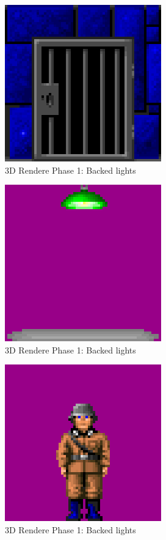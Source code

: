 \documentclass[book.tex]{subfiles}
\begin{document}
  \begin{figure}[H]
\centering
 \includegraphics[scale=1.3]{imgs/wall_texturw.png}
 \caption{3D Rendere Phase 1: Backed lights} \label{fig:backee_lights}
 \end{figure}

  \begin{figure}[H]
\centering
 \includegraphics[scale=1.3]{imgs/light_sprite.png}
 \caption{3D Rendere Phase 1: Backed lights} \label{fig:backee_lights}
 \end{figure}

  \begin{figure}[H]
\centering
 \includegraphics[scale=1.3]{imgs/guard_sprite.png}
 \caption{3D Rendere Phase 1: Backed lights} \label{fig:backee_lights}
 \end{figure}
\end{document}
